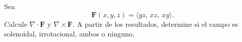 Sea
\[
\mathbf{F}(x,y,z)=\langle yz,\,xz,\,xy\rangle.
\]
Calcule $\nabla\cdot\mathbf{F}$ y $\nabla\times\mathbf{F}$. A partir de los resultados, determine si el campo es solenoidal, irrotacional, ambos o ninguno.
